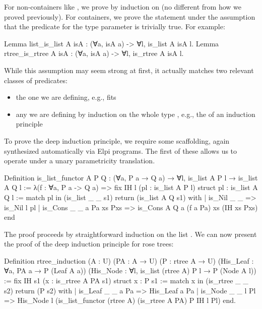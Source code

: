 \documentclass[a4paper, 11pt]{book}
\begin{document}
For non-containers like , we prove  by induction
on  (no different from how we proved  previously). For
containers, we prove the statement under the assumption that the predicate for
the type parameter is trivially true. For example:

\begin{rocqcode}
Lemma list_is_list A isA : (∀a, isA a) -> ∀l, is_list A isA l.
Lemma rtree_is_rtree A isA : (∀a, isA a) -> ∀l, is_rtree A isA l.
\end{rocqcode}

While this assumption may seem strong at first, it actually matches two
relevant classes of predicates:
\begin{itemize}
  \item the one we are defining, e.g.,  fits
  \item any  we are defining by induction on the whole type
    , e.g., the  of an induction principle
\end{itemize}

To prove the deep induction principle, we require some scaffolding, again
synthesized automatically via Elpi programs. The first of these allows us to
operate under a unary parametricity translation.

\begin{rocqcode}
Definition is_list_functor A P Q :
  (∀a, P a → Q a) → ∀l, is_list A P l → is_list A Q l
:=
  λ(f : ∀a, P a -> Q a) =>
    fix IH l (pl : is_list A P l) {struct pl} : is_list A Q l :=
      match pl in (is_list _ _ s1) return (is_list A Q s1) with
      | is_Nil _ _ => is_Nil l pl
      | is_Cons _ _ a Pa xs Pxs =>
          is_Cons A Q a (f a Pa) xs (IH xs Pxs)
      end
\end{rocqcode}


The proof proceeds by straightforward induction on the list . We can
now present the proof of the deep induction principle for rose trees:

\begin{rocqcode}
Definition rtree_induction (A : U) (PA : A → U) (P : rtree A → U)
    (His_Leaf : ∀a, PA a → P (Leaf A a))
    (His_Node : ∀l, is_list (rtree A) P l → P (Node A l))
:=
  fix IH s1 (x : is_rtree A PA s1) {struct x} : P s1 :=
  match x in (is_rtree _ _ s2) return (P s2) with
  | is_Leaf _ _ a Pa =>
      His_Leaf a Pa
  | is_Node _ _ l Pl =>
      His_Node l (is_list_functor (rtree A) (is_rtree A PA) P IH l Pl)
  end.
\end{rocqcode}
\end{document}
